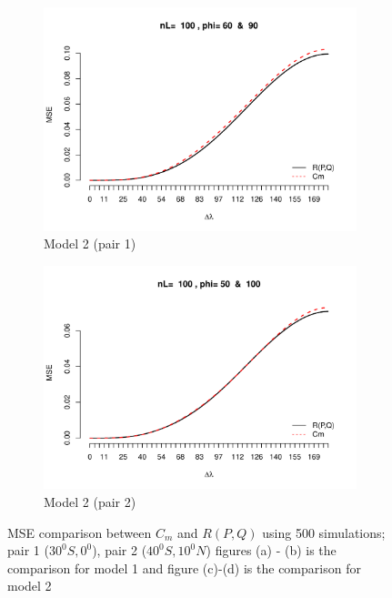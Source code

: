 \begin{figure}[H]
\begin{subfigure}{.5\textwidth}
		\includegraphics[width=1\linewidth]{graphs/MSE_comparison_model2_60_90}
		\caption{Model 2 (pair 1)}
		\label{fig:mse3}
	\end{subfigure}
		\begin{subfigure}{.5\textwidth}
		\centering
		\includegraphics[width=1\linewidth]{graphs/MSE_comparison_model2_50_100}
		\caption{Model 2 (pair 2) }
		\label{fig:mes4}
	\end{subfigure}
	\caption[MSE Comparison Between $C_m$ and $R(P,Q)$ Using 500 Simulations]{MSE comparison between $C_m$ and $R(P,Q)$ using 500 simulations; pair 1 ($30^0S,0^0$), pair 2 ($40^0S, 10^0N$) figures (a) - (b) is the comparison for model 1 and figure (c)-(d) is the comparison for model 2 }
	\label{mse_comparison}
\end{figure}

